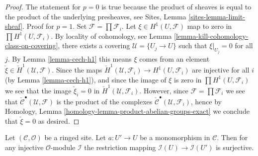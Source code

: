 \begin{proof}
The statement for $p = 0$ is true because the product of sheaves
is equal to the product of the underlying presheaves, see
Sites, Lemma \ref{sites-lemma-limit-sheaf}.
Proof for $p = 1$. Set $\mathcal{F} = \prod \mathcal{F}_i$.
Let $\xi \in H^1(U, \mathcal{F})$ map to zero in
$\prod H^1(U, \mathcal{F}_i)$. By locality of cohomology, see
Lemma \ref{lemma-kill-cohomology-class-on-covering},
there exists a covering $\mathcal{U} = \{U_j \to U\}$ such that
$\xi|_{U_j} = 0$ for all $j$. By Lemma \ref{lemma-cech-h1} this means
$\xi$ comes from an element
$\check \xi \in \check H^1(\mathcal{U}, \mathcal{F})$.
Since the maps
$\check H^1(\mathcal{U}, \mathcal{F}_i) \to H^1(U, \mathcal{F}_i)$
are injective for all $i$ (by Lemma \ref{lemma-cech-h1}), and since
the image of $\xi$ is zero in $\prod H^1(U, \mathcal{F}_i)$ we see
that the image
$\check \xi_i = 0$ in $\check H^1(\mathcal{U}, \mathcal{F}_i)$.
However, since $\mathcal{F} = \prod \mathcal{F}_i$ we see that
$\check{\mathcal{C}}^\bullet(\mathcal{U}, \mathcal{F})$ is the
product of the complexes
$\check{\mathcal{C}}^\bullet(\mathcal{U}, \mathcal{F}_i)$,
hence by
Homology, Lemma \ref{homology-lemma-product-abelian-groups-exact}
we conclude that $\check \xi = 0$ as desired.
\end{proof}

\begin{lemma}
\label{lemma-restriction-along-monomorphism-surjective}
Let $(\mathcal{C}, \mathcal{O})$ be a ringed site. Let $a : U' \to U$ be a
monomorphism in $\mathcal{C}$. Then for any injective $\mathcal{O}$-module
$\mathcal{I}$ the restriction mapping $\mathcal{I}(U) \to \mathcal{I}(U')$
is surjective.
\end{lemma}

